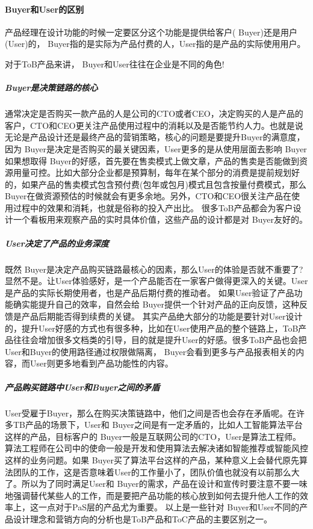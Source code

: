 \documentclass[letterpaper,11pt,english]{sphinxmanual}
\begin{document}
\paragraph{Buyer和User的区别}
\label{\detokenize{chapter_introduction/2B:buyeruser}}
产品经理在设计功能的时候一定要区分这个功能是提供给客户(
Buyer)还是用户(User)的，
Buyer指的是实际为产品付费的人，User指的是产品的实际使用用户。

对于ToB产品来讲， Buyer和User往往在企业是不同的角色!


\subparagraph{Buyer是决策链路的核心}
\label{\detokenize{chapter_introduction/2B:buyer}}
通常决定是否购买一款产品的人是公司的CTO或者CEO，决定购买的人是产品的客户，CTO和CEO更关注产品使用过程中的消耗以及是否能节约人力。也就是说无论是产品设计还是最终产品的营销策略，核心的问题是要提升Buyer的满意度，因为
Buyer是决定是否购买的最关键因素，User更多的是从使用层面去影响
Buyer如果想取得
Buyer的好感，首先要在售卖模式上做文章，产品的售卖是否能做到资源用量可控。比如大部分企业都是预算制，每年在某个部分的消费是提前规划好的，如果产品的售卖模式包含预付费(包年或包月)模式且包含按量付费模式，那么
Buyer在做资源预估的时候就会有更多余地。另外，CTO和CEO很关注产品在使用过程中的效果和消耗，也就是俗称的投入产出比。
很多ToB产品都会为客户设计一个看板用来观察产品的实时具体价值，这些产品的设计都是对
Buyer友好的。


\subparagraph{User决定了产品的业务深度}
\label{\detokenize{chapter_introduction/2B:user}}
既然
Buyer是决定产品购买链路最核心的因素，那么User的体验是否就不重要了?显然不是。让User体验感好，是一个产品能否在一家客户做得更深入的关键。User是产品的实际长期使用者，也是产品后期付费的推动者。
如果User验证了产品功能确实能提升自己的效率，自然会给
Buyer提供一个针对产品的正向反馈，这种反馈是产品后期能否得到续费的关键。
其实产品绝大部分的功能是要针对User设计的，提升User好感的方式也有很多种，比如在User使用产品的整个链路上，ToB产品往往会增加很多文档类的引导，目的就是提升User的好感。很多ToB产品也会把User和Buyer的使用路径通过权限做隔离，
Buyer会看到更多与产品报表相关的内容，而User则更多地看到产品功能性的内容。


\subparagraph{产品购买链路中User和Buyer之间的矛盾}
\label{\detokenize{chapter_introduction/2B:userbuyer}}
User受雇于Buyer，那么在购买决策链路中，他们之间是否也会存在矛盾呢。在许多TB产品的场景下，User和
Buyer之间是有一定矛盾的，比如人工智能算法平台这样的产品，目标客户的
Buyer一般是互联网公司的CTO，User是算法工程师。算法工程师在公司中的使命一般是开发和使用算法去解决诸如智能推荐或智能风控这样的业务问题。如果
Buyer买了算法平台这样的产品，某种意义上会替代原先算法团队的工作，这是否意味着User的工作量小了，团队价值也就没有以前那么大了。所以为了同时满足User和
Buyer的需求，产品在设计和宣传时要注意不要一味地强调替代某些人的工作，而是要把产品功能的核心放到如何去提升他人工作的效率上，这一点对于PaS层的产品尤为重要。
以上是一些针对
Buyer和User不同的产品设计理念和营销方向的分析也是ToB产品和ToC产品的主要区别之一。
\end{document}
